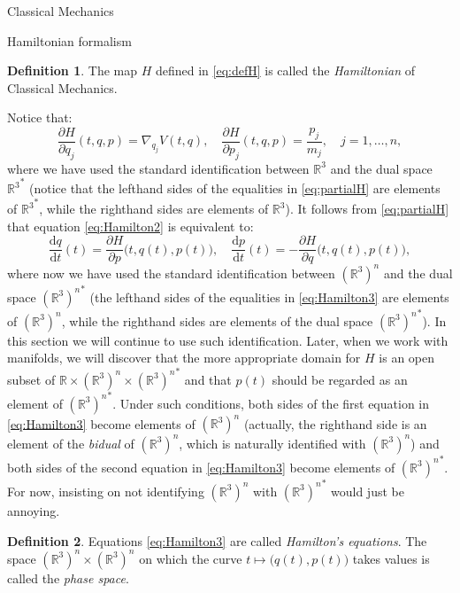 \documentclass[oneside,a4paper,11pt]{amsbook}
\newcommand{\R}{\mathds R}
\newcommand{\dd}{\mathrm d}
\theoremstyle{remark}\newtheorem{exercise}{Exercise}[chapter]
\theoremstyle{plain}\newtheorem{teo}{Theorem}[section]
\theoremstyle{plain}\newtheorem{lem}[teo]{Lemma}
\theoremstyle{plain}\newtheorem{prop}[teo]{Proposition}
\theoremstyle{plain}\newtheorem{cor}[teo]{Corollary}
\theoremstyle{definition}\newtheorem{defin}[teo]{Definition}
\theoremstyle{remark}\newtheorem{rem}[teo]{Remark}
\theoremstyle{definition}\newtheorem{notation}[teo]{Notation}
\theoremstyle{definition}\newtheorem{convention}[teo]{Convention}
\theoremstyle{definition}\newtheorem{example}[teo]{Example}
\numberwithin{section}{chapter}
\numberwithin{equation}{section}
\begin{document}
\begin{chapter}{Classical Mechanics}
\begin{section}{Hamiltonian formalism}
\begin{defin}
The map $H$ defined in \eqref{eq:defH} is called the {\em Hamiltonian\/} of Classical Mechanics.
\end{defin}

Notice that:
\begin{equation}\label{eq:partialH}
\frac{\partial H}{\partial q_j}(t,q,p)=\nabla_{q_j}V(t,q),\quad
\frac{\partial H}{\partial p_j}(t,q,p)=\frac{p_j}{m_j},\quad j=1,\ldots,n,
\end{equation}
where we have used the standard identification between $\R^3$ and the dual space ${\R^3}^*$ (notice that
the lefthand sides of the equalities in \eqref{eq:partialH} are elements of ${\R^3}^*$, while the righthand
sides are elements of $\R^3$). It follows from
\eqref{eq:partialH} that equation \eqref{eq:Hamilton2} is equivalent to:
\begin{equation}\label{eq:Hamilton3}
\frac{\dd q}{\dd t}(t)=\frac{\partial H}{\partial p}\big(t,q(t),p(t)\big),\quad
\frac{\dd p}{\dd t}(t)=-\frac{\partial H}{\partial q}\big(t,q(t),p(t)\big),
\end{equation}
where now we have used the standard identification between $(\R^3)^n$ and the dual space
${(\R^3)^n}^*$ (the lefthand sides of the equalities in \eqref{eq:Hamilton3} are elements of $(\R^3)^n$,
while the righthand sides are elements of the dual space ${(\R^3)^n}^*$).
In this section we will continue to use such identification.
Later, when we work with manifolds, we will discover that
the more appropriate domain for $H$ is an open subset of $\R\times(\R^3)^n\times{(\R^3)^n}^*$ and that $p(t)$ should be
regarded as an element of ${(\R^3)^n}^*$. Under such conditions, both sides of the first equation in \eqref{eq:Hamilton3}
become elements of $(\R^3)^n$ (actually, the righthand side is an element of the {\em bidual\/} of $(\R^3)^n$, which
is naturally identified with $(\R^3)^n$) and both sides of the second equation in \eqref{eq:Hamilton3} become
elements of ${(\R^3)^n}^*$. For now, insisting on not identifying $(\R^3)^n$ with ${(\R^3)^n}^*$ would just be annoying.

\begin{defin}
Equations \eqref{eq:Hamilton3} are called {\em Hamilton's equations}.
The space $(\R^3)^n\times(\R^3)^n$ on which the curve $t\mapsto\big(q(t),p(t)\big)$ takes values is called the
{\em phase space}.
\end{defin}


\end{section}
\end{chapter}
\end{document}

